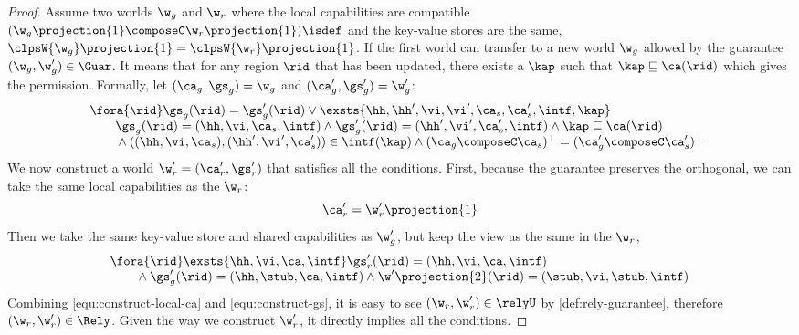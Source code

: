 \begin{proof}
Assume two worlds \( \w_g \) and \( \w_r \) where the local capabilities are compatible \((\w_g\projection{1} \composeC \w_r\projection{1})\isdef\) and the key-value stores are the same, \ie \( \clpsW{\w_g}\projection{1} = \clpsW{\w_r}\projection{1} \).
If the first world can transfer to a new world \( \w_g \) allowed by the guarantee \( (\w_g, \w_g' ) \in \Guar \).
It means that for any region \( \rid \) that has been updated, there exists a \( \kap \) such that \( \kap \sqsubseteq \ca(\rid) \) which gives the permission.
Formally, let \( (\ca_g, \gs_g) = \w_g \) and \( (\ca_g', \gs_g') = \w_g' \):
\[
\begin{array}{@{}l}
    \fora{\rid} 
    \gs_g(\rid) = \gs_g'(\rid) \lor 
    \exsts{\hh, \hh', \vi, \vi', \ca_s, \ca_{s}', \intf, \kap} \\
    \qquad \gs_g(\rid) = (\hh, \vi, \ca_{s}, \intf) 
    \land \gs_g'(\rid) = (\hh', \vi', \ca_{s}', \intf)
    \land \kap \sqsubseteq \ca(\rid) \\
    \qquad {} \land ((\hh, \vi, \ca_{s}), (\hh', \vi', \ca_{s}')) \in \intf(\kap)
    \land (\ca_g \composeC \ca_s)^{\perp} = (\ca_g' \composeC \ca_s')^{\perp}
\end{array} 
\]
We now construct a world \( \w_r' = (\ca_r', \gs_r') \) that satisfies all the conditions.
First, because the guarantee preserves the orthogonal, we can take the same local capabilities as the \( \w_r \):
\begin{equation}
\label{equ:construct-local-ca}
    \ca_r' = \w_r'\projection{1}
\end{equation}
Then we take the same key-value store and shared capabilities as \( \w_g' \), but keep the view as the same in the \( \w_r \),
\begin{equation}
\label{equ:construct-gs}
\begin{array}{l}
    \fora{\rid} \exsts{\hh,\vi,\ca,\intf} \gs_r'(\rid) = (\hh, \vi, \ca, \intf) \\
    \qquad {} \land \gs_g'(\rid) = (\hh, \stub, \ca, \intf) \land \w'\projection{2}(\rid) = (\stub, \vi, \stub, \intf)
\end{array}
\end{equation}
Combining \cref{equ:construct-local-ca} and \cref{equ:construct-gs}, it is easy to see \( ( \w_r, \w_r' ) \in \relyU \) by \cref{def:rely-guarantee}, therefore \( ( \w_r, \w_r' ) \in \Rely \).
Given the way we construct \( \w_r' \), it directly implies all the conditions.
\end{proof}


